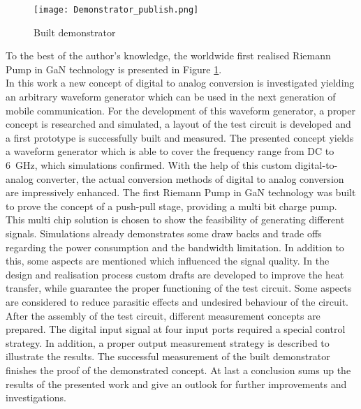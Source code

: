 \begin{figure}[h] %
	\centering
  \texttt{[image: Demonstrator\_publish.png]}
	\caption{Built demonstrator}
	\label{fig:Demonstrator}
\end{figure}
To the best of the author's knowledge, the worldwide first realised Riemann Pump in GaN technology is presented in Figure \ref{fig:Demonstrator}.\\

In this work a new concept of digital to analog conversion is investigated yielding an arbitrary waveform generator which can be used in the next generation of mobile communication.
For the development of this waveform generator, a proper concept is researched and simulated, a layout of the test circuit is developed and a first prototype is successfully built and measured.
The presented concept yields a waveform generator which is able to cover the frequency range from DC to \SI{6}{\giga \hertz}, which simulations confirmed.
With the help of this custom digital-to-analog converter, the actual conversion methods of digital to analog conversion are impressively enhanced.
The first Riemann Pump in GaN technology was built to prove the concept of a push-pull stage, providing a multi bit charge pump.
This multi chip solution is chosen to show the feasibility of generating different signals.
Simulations already demonstrates some draw backs and trade offs regarding the power consumption and the bandwidth limitation.
In addition to this, some aspects are mentioned which influenced the signal quality.
In the design and realisation process custom drafts are developed to improve the heat transfer, while guarantee the proper functioning of the test circuit.
Some aspects are considered to reduce parasitic effects and undesired behaviour of the circuit.
After the assembly of the test circuit, different measurement concepts are prepared.
The digital input signal at four input ports required a special control strategy.
In addition, a proper output measurement strategy is described to illustrate the results.
The successful measurement of the built demonstrator finishes the proof of the demonstrated concept.
At last a conclusion sums up the results of the presented work and give an outlook for further improvements and investigations.





